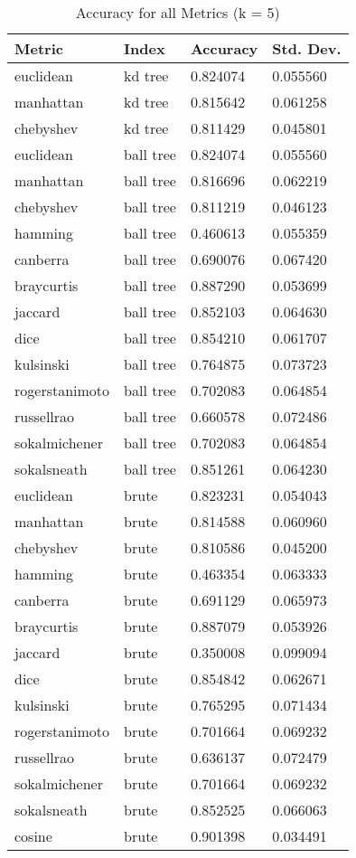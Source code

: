 \begin{table}
  \centering
  \caption{Accuracy for all Metrics (k = 5)}
  \begin{tabular}{|l|l|l|l|}
    \hline
    {\bf Metric} & {\bf Index} & {\bf Accuracy} & {\bf Std. Dev.} \\\hline
    euclidean & kd tree & 0.824074 & 0.055560 \\\hline
    manhattan & kd tree & 0.815642 & 0.061258 \\\hline
    chebyshev & kd tree & 0.811429 & 0.045801 \\\hline
    euclidean & ball tree & 0.824074 & 0.055560 \\\hline
    manhattan & ball tree & 0.816696 & 0.062219 \\\hline
    chebyshev & ball tree & 0.811219 & 0.046123 \\\hline
    hamming & ball tree & 0.460613 & 0.055359 \\\hline
    canberra & ball tree & 0.690076 & 0.067420 \\\hline
    braycurtis & ball tree & 0.887290 & 0.053699 \\\hline
    jaccard & ball tree & 0.852103 & 0.064630 \\\hline
    dice & ball tree & 0.854210 & 0.061707 \\\hline
    kulsinski & ball tree & 0.764875 & 0.073723 \\\hline
    rogerstanimoto & ball tree & 0.702083 & 0.064854 \\\hline
    russellrao & ball tree & 0.660578 & 0.072486 \\\hline
    sokalmichener & ball tree & 0.702083 & 0.064854 \\\hline
    sokalsneath & ball tree & 0.851261 & 0.064230 \\\hline
    euclidean & brute & 0.823231 & 0.054043 \\\hline
    manhattan & brute & 0.814588 & 0.060960 \\\hline
    chebyshev & brute & 0.810586 & 0.045200 \\\hline
    hamming & brute & 0.463354 & 0.063333 \\\hline
    canberra & brute & 0.691129 & 0.065973 \\\hline
    braycurtis & brute & 0.887079 & 0.053926 \\\hline
    jaccard & brute & 0.350008 & 0.099094 \\\hline
    dice & brute & 0.854842 & 0.062671 \\\hline
    kulsinski & brute & 0.765295 & 0.071434 \\\hline
    rogerstanimoto & brute & 0.701664 & 0.069232 \\\hline
    russellrao & brute & 0.636137 & 0.072479 \\\hline
    sokalmichener & brute & 0.701664 & 0.069232 \\\hline
    sokalsneath & brute & 0.852525 & 0.066063 \\\hline
    cosine & brute & 0.901398 & 0.034491 \\\hline
  \end{tabular}
  \tableSpace
\end{table}
